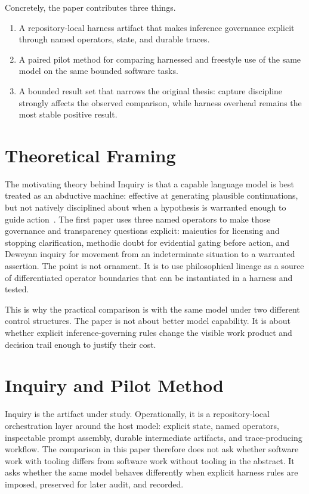 \documentclass[conference]{IEEEtran}
\begin{document}
Concretely, the paper contributes three things.

\begin{enumerate}
\item A repository-local harness artifact that makes inference governance explicit
through named operators, state, and durable traces.
\item A paired pilot method for comparing harnessed and freestyle use of the same model
on the same bounded software tasks.
\item A bounded result set that narrows the original thesis: capture discipline strongly
affects the observed comparison, while harness overhead remains the most stable
positive result.
\end{enumerate}

\section{Theoretical Framing}

The motivating theory behind Inquiry is that a capable language model is best treated as
an abductive machine: effective at generating plausible continuations, but not natively
disciplined about when a hypothesis is warranted enough to guide action~\cite{peirce_dih,peirce_cp}.
The first paper uses three named operators to make those governance and transparency
questions explicit: maieutics for licensing and stopping clarification, methodic doubt
for evidential gating before action, and Deweyan inquiry for movement from an
indeterminate situation to a warranted assertion. The point is not ornament. It is to
use philosophical lineage as a source of differentiated operator boundaries that can be
instantiated in a harness and tested.

This is why the practical comparison is with the same model under two different control
structures. The paper is not about better model capability. It is about whether
explicit inference-governing rules change the visible work product and decision trail
enough to justify their cost.

\section{Inquiry and Pilot Method}

Inquiry is the artifact under study. Operationally, it is a repository-local
orchestration layer around the host model: explicit state, named operators, inspectable
prompt assembly, durable intermediate artifacts, and trace-producing workflow. The
comparison in this paper therefore does not ask whether software work with tooling
differs from software work without tooling in the abstract. It asks whether the same
model behaves differently when explicit harness rules are imposed, preserved for later
audit, and recorded.
\end{document}
